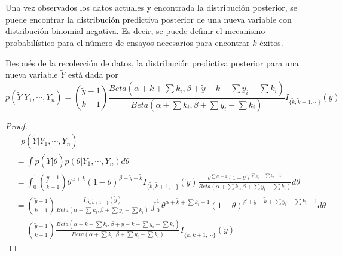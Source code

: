     Una vez observados los datos actuales y encontrada la distribuci\'on posterior, se puede encontrar la distribuci\'on predictiva posterior de una nueva variable con distribuci\'on binomial negativa. Es decir, se puede definir el mecanismo probabil\'istico para el n\'umero de ensayos necesarios para encontrar $\tilde{k}$ \'exitos.
    \begin{Res}
    Despu\'es de la recolecci\'on de datos, la distribuci\'on predictiva posterior para una nueva variable $\tilde{Y}$ est\'a dada por
    \begin{equation*}
    p(\tilde{Y}|Y_1,\cdots,Y_n)=\binom{\tilde{y}-1}{\tilde{k}-1}\frac{Beta(\alpha+\tilde{k}+\sum k_i,\beta+\tilde{y}-\tilde{k}+\sum y_i-\sum k_i)}{Beta(\alpha+\sum k_i,\beta+\sum y_i-\sum k_i)}I_{\{\tilde{k},\tilde{k}+1,\cdots\}}(\tilde{y})
    \end{equation*}
    \end{Res}
    
    \begin{proof}
    \begin{align*}
    &\ \ \ p(\tilde{Y}|Y_1,\cdots,Y_n)\\
    &=\int p(\tilde{Y}|\theta)p(\theta|Y_1,\cdots,Y_n)d\theta\\
    &=\int_{0}^1\binom{\tilde{y}-1}{\tilde{k}-1}\theta^{\alpha+\tilde{k}}(1-\theta)^{\beta+\tilde{y}-\tilde{k}}I_{\{\tilde{k},\tilde{k}+1,\cdots\}}(\tilde{y})\frac{\theta^{\sum k_i-1}(1-\theta)^{\sum y_i-\sum k_i-1}}{Beta(\alpha+\sum k_i,\beta+\sum y_i-\sum k_i)}d\theta\\
    &=\binom{\tilde{y}-1}{\tilde{k}-1}\frac{I_{\{\tilde{k},\tilde{k}+1,\cdots\}}(\tilde{y})}{Beta(\alpha+\sum k_i,\beta+\sum y_i-\sum k_i)}\int_{0}^1\theta^{\alpha+\tilde{k}+\sum k_i-1}(1-\theta)^{\beta+\tilde{y}-\tilde{k}+\sum y_i-\sum k_i-1}d\theta\\
    &=\binom{\tilde{y}-1}{\tilde{k}-1}\frac{Beta(\alpha+\tilde{k}+\sum k_i,\beta+\tilde{y}-\tilde{k}+\sum y_i-\sum k_i)}{Beta(\alpha+\sum k_i,\beta+\sum y_i-\sum k_i)}I_{\{\tilde{k},\tilde{k}+1,\cdots\}}(\tilde{y})
    \end{align*}
    \end{proof}
    
